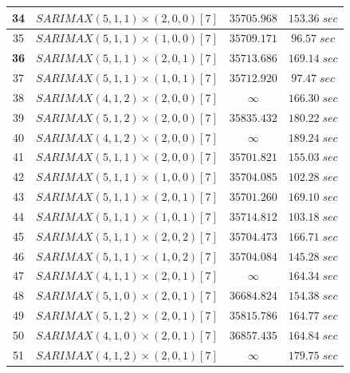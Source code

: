 \documentclass[conference]{IEEEtran}
\begin{document}
\begin{table}[htbp]
\begin{tabular}{|c|c|c|c|}
        \hline
        34 &  $SARIMAX(5, 1, 1) \times (2, 0, 0)[7]$ & $35705.968$ & $153.36 \; sec$ \\
        \hline
        35 &  $SARIMAX(5, 1, 1) \times (1, 0, 0)[7]$ & $35709.171$ & $96.57 \; sec$ \\
        \hline
        \textbf{36} &  $SARIMAX(5, 1, 1) \times (2, 0, 1)[7]$ & $35713.686$ & $169.14 \; sec$ \\
        \hline
        37 &  $SARIMAX(5, 1, 1) \times (1, 0, 1)[7]$ & $35712.920$ & $97.47 \; sec$ \\
        \hline
        38 &  $SARIMAX(4, 1, 2) \times (2, 0, 0)[7]$ & $\infty$ & $166.30 \; sec$ \\
        \hline
        39 &  $SARIMAX(5, 1, 2) \times (2, 0, 0)[7]$ & $35835.432$ & $180.22 \; sec$ \\
        \hline
        40 &  $SARIMAX(4, 1, 2) \times (2, 0, 0)[7]$ & $\infty$ & $189.24 \; sec$ \\
        \hline
        41 &  $SARIMAX(5, 1, 1) \times (2, 0, 0)[7]$ & $35701.821$ & $155.03 \; sec$ \\
        \hline
        42 &  $SARIMAX(5, 1, 1) \times (1, 0, 0)[7]$ & $35704.085$ & $102.28 \; sec$ \\
        \hline
        43 &  $SARIMAX(5, 1, 1) \times (2, 0, 1)[7]$ & $35701.260$ & $169.10 \; sec$ \\
        \hline
        44 &  $SARIMAX(5, 1, 1) \times (1, 0, 1)[7]$ & $35714.812$ & $103.18 \; sec$ \\
        \hline
        45 &  $SARIMAX(5, 1, 1) \times (2, 0, 2)[7]$ & $35704.473$ & $166.71 \; sec$ \\
        \hline
        46 &  $SARIMAX(5, 1, 1) \times (1, 0, 2)[7]$ & $35704.084$ & $145.28 \; sec$ \\
        \hline
        47 &  $SARIMAX(4, 1, 1) \times (2, 0, 1)[7]$ & $\infty$ & $164.34 \; sec$ \\
        \hline
        48 &  $SARIMAX(5, 1, 0) \times (2, 0, 1)[7]$ & $36684.824$ & $154.38 \; sec$ \\
        \hline
        49 &  $SARIMAX(5, 1, 2) \times (2, 0, 1)[7]$ & $35815.786$ & $164.77 \; sec$ \\
        \hline
        50 &  $SARIMAX(4, 1, 0) \times (2, 0, 1)[7]$ & $36857.435$ & $164.84 \; sec$ \\
        \hline
        51 &  $SARIMAX(4, 1, 2) \times (2, 0, 1)[7]$ & $\infty$ & $179.75 \; sec$ \\
        \hline
    \end{tabular}
    \label{tab:s_and_p_500_hyperparameters_tunning_results_table}
\end{table}
\end{document}
